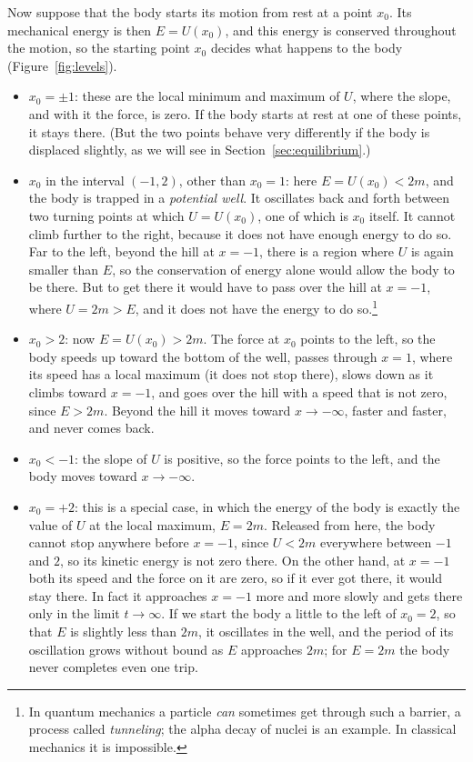 \documentclass[11pt,a4paper]{article}
\begin{document}
Now suppose that the body starts its motion from rest at a point $x_0$. Its mechanical energy is
then $E = U(x_0)$, and this energy is conserved throughout the motion, so the starting point $x_0$
decides what happens to the body (Figure~\ref{fig:levels}).
\begin{itemize}
\item $x_0 = \pm 1$: these are the local minimum and maximum of $U$, where the slope, and with it
  the force, is zero. If the body starts at rest at one of these points, it stays there. (But the two
  points behave very differently if the body is displaced slightly, as we will see in
  Section~\ref{sec:equilibrium}.)
\item $x_0$ in the interval $(-1, 2)$, other than $x_0 = 1$: here $E = U(x_0) < 2m$, and the body is
  trapped in a \emph{potential well}. It oscillates back and forth between two turning points at
  which $U = U(x_0)$, one of which is $x_0$ itself. It cannot climb further to the right, because it
  does not have enough energy to do so. Far to the left, beyond the hill at $x = -1$, there is a
  region where $U$ is again smaller than $E$, so the conservation of energy alone would allow the body
  to be there. But to get there it would have to pass over the hill at $x = -1$, where $U = 2m > E$,
  and it does not have the energy to do so.\footnote{In quantum mechanics a particle \emph{can}
  sometimes get through such a barrier, a process called \emph{tunneling}; the alpha decay of
  nuclei is an example. In classical mechanics it is impossible.}
\item $x_0 > 2$: now $E = U(x_0) > 2m$. The force at $x_0$ points to the left, so the body speeds up
  toward the bottom of the well, passes through $x = 1$, where its speed has a local maximum (it does
  not stop there), slows down as it climbs toward $x = -1$, and goes over the hill with a speed that
  is not zero, since $E > 2m$. Beyond the hill it moves toward $x \to -\infty$, faster and faster, and
  never comes back.
\item $x_0 < -1$: the slope of $U$ is positive, so the force points to the left, and the body moves
  toward $x \to -\infty$.
\item $x_0 = +2$: this is a special case, in which the energy of the body is exactly the value of $U$
  at the local maximum, $E = 2m$. Released from here, the body cannot stop anywhere before
  $x = -1$, since $U < 2m$ everywhere between $-1$ and $2$, so its kinetic energy is not zero there. On
  the other hand, at $x = -1$ both its speed and the force on it are zero, so if it ever got there,
  it would stay there. In fact it approaches $x = -1$ more and more slowly and gets there only in the
  limit $t \to \infty$. If we start the body a little to the left of $x_0 = 2$, so that $E$ is
  slightly less than $2m$, it oscillates in the well, and the period of its oscillation grows without
  bound as $E$ approaches $2m$; for $E = 2m$ the body never completes even one trip.
\end{itemize}
\end{document}

